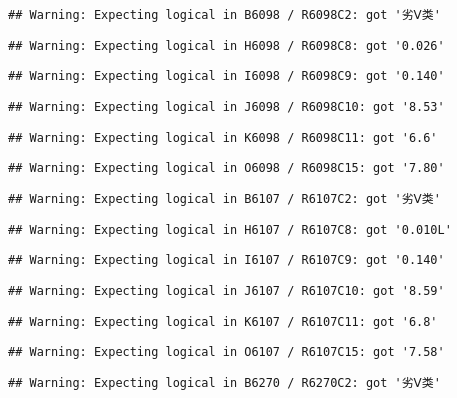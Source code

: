 \documentclass[
]{article}
\begin{document}
\begin{verbatim}
## Warning: Expecting logical in B6098 / R6098C2: got '劣Ⅴ类'
\end{verbatim}

\begin{verbatim}
## Warning: Expecting logical in H6098 / R6098C8: got '0.026'
\end{verbatim}

\begin{verbatim}
## Warning: Expecting logical in I6098 / R6098C9: got '0.140'
\end{verbatim}

\begin{verbatim}
## Warning: Expecting logical in J6098 / R6098C10: got '8.53'
\end{verbatim}

\begin{verbatim}
## Warning: Expecting logical in K6098 / R6098C11: got '6.6'
\end{verbatim}

\begin{verbatim}
## Warning: Expecting logical in O6098 / R6098C15: got '7.80'
\end{verbatim}

\begin{verbatim}
## Warning: Expecting logical in B6107 / R6107C2: got '劣Ⅴ类'
\end{verbatim}

\begin{verbatim}
## Warning: Expecting logical in H6107 / R6107C8: got '0.010L'
\end{verbatim}

\begin{verbatim}
## Warning: Expecting logical in I6107 / R6107C9: got '0.140'
\end{verbatim}

\begin{verbatim}
## Warning: Expecting logical in J6107 / R6107C10: got '8.59'
\end{verbatim}

\begin{verbatim}
## Warning: Expecting logical in K6107 / R6107C11: got '6.8'
\end{verbatim}

\begin{verbatim}
## Warning: Expecting logical in O6107 / R6107C15: got '7.58'
\end{verbatim}

\begin{verbatim}
## Warning: Expecting logical in B6270 / R6270C2: got '劣Ⅴ类'
\end{verbatim}
\end{document}
